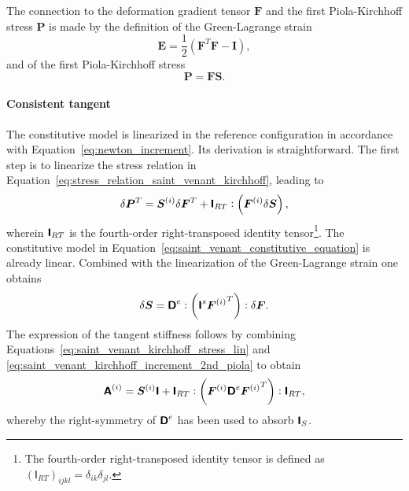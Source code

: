 The connection to the deformation gradient tensor \(\boldsymbol{F}\) and the first Piola-Kirchhoff stress \(\boldsymbol{P}\) is made by the definition of the Green-Lagrange strain
\begin{equation}
\boldsymbol{E}=\frac{1}{2}\left(\boldsymbol{F}^{T}\boldsymbol{F}-\boldsymbol{I}\right),
\end{equation}
and of the first Piola-Kirchhoff stress
\begin{equation} \label{eq:stress_relation_saint_venant_kirchhoff}
\boldsymbol{P}=\boldsymbol{F} \boldsymbol{S}.
\end{equation}

\paragraph{Consistent tangent}
The constitutive model is linearized in the reference configuration in accordance with Equation~\eqref{eq:newton_increment}.
Its derivation is straightforward.
The first step is to linearize the stress relation in Equation~\eqref{eq:stress_relation_saint_venant_kirchhoff}, leading to
\begin{equation} \label{eq:saint_venant_kirchhoff_stress_lin}
\delta \boldsymbol{P}^{T}=\boldsymbol{S}^{(i)}\delta \boldsymbol{F}^{T}+\boldsymbol{\mathsf{I}}_{R T}:\left(\boldsymbol{F}^{(i)}\delta \boldsymbol{S}\right),
\end{equation}
wherein \(\boldsymbol{\mathsf{I}}_{R T}\) is the fourth-order right-transposed identity tensor\footnote{The fourth-order right-transposed identity tensor is defined as \((\mathsf I_{RT})_{ijkl} = \delta_{ik}\delta_{jl}\).}.
The constitutive model in Equation~\eqref{eq:saint_venant_constitutive_equation} is already linear.
Combined with the linearization of the Green-Lagrange strain one obtains
\begin{equation} \label{eq:saint_venant_kirchhoff_increment_2nd_piola}
\delta \boldsymbol{S}=\boldsymbol{\mathsf{D}}^e:\left(\boldsymbol{\mathsf{I}}^{s}{\boldsymbol{F}^{(i)}}^{T}\right): \delta \boldsymbol{F}.
\end{equation}
The expression of the tangent stiffness follows by combining Equations~\eqref{eq:saint_venant_kirchhoff_stress_lin} and \eqref{eq:saint_venant_kirchhoff_increment_2nd_piola} to obtain
\begin{equation}
\boldsymbol{\mathsf{A}}^{(i)}=\boldsymbol{S}^{(i)}\boldsymbol{\mathsf{I}}+\boldsymbol{\mathsf{I}}_{R T}:\left(\boldsymbol{F}^{(i)}  \boldsymbol{\mathsf{D}}^e  {\boldsymbol{F}^{(i)}}^{T}\right): \boldsymbol{\mathsf{I}}_{R T},
\end{equation}
whereby the right-symmetry of \(\boldsymbol{\mathsf{D}}^e\) has been used to absorb \(\boldsymbol{\mathsf{I}}_{S}\).

